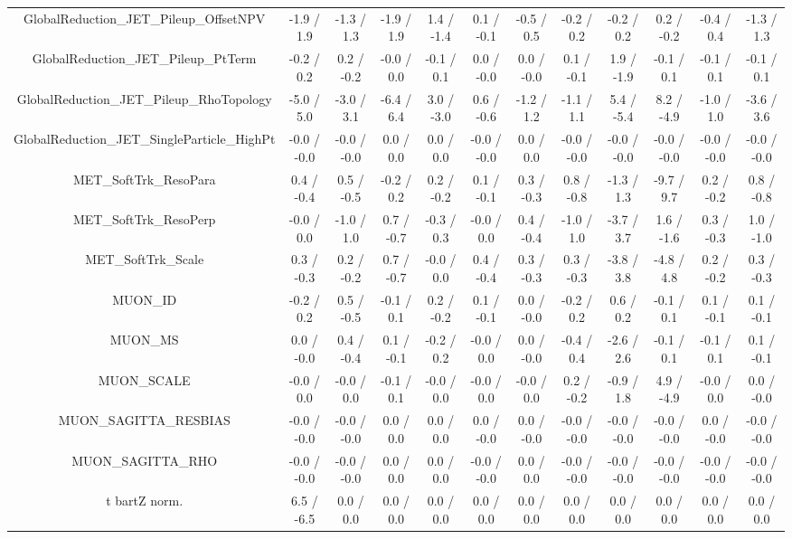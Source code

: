 \begin{table}[htbp]
\begin{center}
\begin{tabular}{|c|c|c|c|c|c|c|c|c|c|c|c|}
  GlobalReduction_JET_Pileup_OffsetNPV & -1.9 / 1.9 & -1.3 / 1.3 & -1.9 / 1.9 & 1.4 / -1.4 & 0.1 / -0.1 & -0.5 / 0.5 & -0.2 / 0.2 & -0.2 / 0.2 & 0.2 / -0.2 & -0.4 / 0.4 & -1.3 / 1.3 \\ 
  GlobalReduction_JET_Pileup_PtTerm & -0.2 / 0.2 & 0.2 / -0.2 & -0.0 / 0.0 & -0.1 / 0.1 & 0.0 / -0.0 & 0.0 / -0.0 & 0.1 / -0.1 & 1.9 / -1.9 & -0.1 / 0.1 & -0.1 / 0.1 & -0.1 / 0.1 \\ 
  GlobalReduction_JET_Pileup_RhoTopology & -5.0 / 5.0 & -3.0 / 3.1 & -6.4 / 6.4 & 3.0 / -3.0 & 0.6 / -0.6 & -1.2 / 1.2 & -1.1 / 1.1 & 5.4 / -5.4 & 8.2 / -4.9 & -1.0 / 1.0 & -3.6 / 3.6 \\ 
  GlobalReduction_JET_SingleParticle_HighPt & -0.0 / -0.0 & -0.0 / -0.0 & 0.0 / 0.0 & 0.0 / 0.0 & -0.0 / -0.0 & 0.0 / 0.0 & -0.0 / -0.0 & -0.0 / -0.0 & -0.0 / -0.0 & -0.0 / -0.0 & -0.0 / -0.0 \\ 
  MET_SoftTrk_ResoPara & 0.4 / -0.4 & 0.5 / -0.5 & -0.2 / 0.2 & 0.2 / -0.2 & 0.1 / -0.1 & 0.3 / -0.3 & 0.8 / -0.8 & -1.3 / 1.3 & -9.7 / 9.7 & 0.2 / -0.2 & 0.8 / -0.8 \\ 
  MET_SoftTrk_ResoPerp & -0.0 / 0.0 & -1.0 / 1.0 & 0.7 / -0.7 & -0.3 / 0.3 & -0.0 / 0.0 & 0.4 / -0.4 & -1.0 / 1.0 & -3.7 / 3.7 & 1.6 / -1.6 & 0.3 / -0.3 & 1.0 / -1.0 \\ 
  MET_SoftTrk_Scale & 0.3 / -0.3 & 0.2 / -0.2 & 0.7 / -0.7 & -0.0 / 0.0 & 0.4 / -0.4 & 0.3 / -0.3 & 0.3 / -0.3 & -3.8 / 3.8 & -4.8 / 4.8 & 0.2 / -0.2 & 0.3 / -0.3 \\ 
  MUON_ID & -0.2 / 0.2 & 0.5 / -0.5 & -0.1 / 0.1 & 0.2 / -0.2 & 0.1 / -0.1 & 0.0 / -0.0 & -0.2 / 0.2 & 0.6 / 0.2 & -0.1 / 0.1 & 0.1 / -0.1 & 0.1 / -0.1 \\ 
  MUON_MS & 0.0 / -0.0 & 0.4 / -0.4 & 0.1 / -0.1 & -0.2 / 0.2 & -0.0 / 0.0 & 0.0 / -0.0 & -0.4 / 0.4 & -2.6 / 2.6 & -0.1 / 0.1 & -0.1 / 0.1 & 0.1 / -0.1 \\ 
  MUON_SCALE & -0.0 / 0.0 & -0.0 / 0.0 & -0.1 / 0.1 & -0.0 / 0.0 & -0.0 / 0.0 & -0.0 / 0.0 & 0.2 / -0.2 & -0.9 / 1.8 & 4.9 / -4.9 & -0.0 / 0.0 & 0.0 / -0.0 \\ 
  MUON_SAGITTA_RESBIAS & -0.0 / -0.0 & -0.0 / -0.0 & 0.0 / 0.0 & 0.0 / 0.0 & 0.0 / -0.0 & 0.0 / -0.0 & -0.0 / -0.0 & -0.0 / -0.0 & -0.0 / -0.0 & 0.0 / -0.0 & -0.0 / -0.0 \\ 
  MUON_SAGITTA_RHO & -0.0 / -0.0 & -0.0 / -0.0 & 0.0 / 0.0 & 0.0 / 0.0 & -0.0 / -0.0 & 0.0 / 0.0 & -0.0 / -0.0 & -0.0 / -0.0 & -0.0 / -0.0 & -0.0 / -0.0 & -0.0 / -0.0 \\ 
  t bar{t}Z norm. & 6.5 / -6.5 & 0.0 / 0.0 & 0.0 / 0.0 & 0.0 / 0.0 & 0.0 / 0.0 & 0.0 / 0.0 & 0.0 / 0.0 & 0.0 / 0.0 & 0.0 / 0.0 & 0.0 / 0.0 & 0.0 / 0.0 \\ 

\end{tabular}
\end{center}
\end{table}
